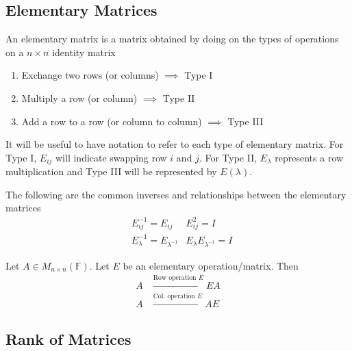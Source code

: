 \documentclass[../notes.tex]{subfiles}
\begin{document}

\subsection{Elementary Matrices}

\begin{definition}
    An elementary matrix is a matrix obtained by doing on the types of operations on a $n \times n$ identity matrix
    \begin{enumerate}
        \item Exchange two rows (or columns) $\implies$ Type I
        \item Multiply a row (or column) $\implies$ Type II
        \item Add a row to a row (or column to column) $\implies$ Type III
    \end{enumerate}
\end{definition}

It will be useful to have notation to refer to each type of elementary matrix. For Type I, $E_{ij}$ will indicate swapping row $i$ and $j$. For Type II, $E_{\lambda}$ represents a row multiplication and Type III will be represented by $E(\lambda)$.

\begin{tcolorbox}[sharp corners = all, colback = white,]
    The following are the common inverses and relationships between the elementary matrices
    \begin{align*}
        & E_{ij}^{-1} = E_{ij} & E_{ij}^2 = I \\
        & E_{\lambda}^{-1} = E_{\lambda^{-1}} & E_{\lambda} E_{\lambda^{-1}} = I
    \end{align*}
\end{tcolorbox}

\begin{theorem}
    Let $A \in M_{n\times n}(\mathbb{F})$. Let $E$ be an elementary operation/matrix. Then
    \begin{align*}
        A &\xrightarrow{\text{Row operation } E} EA \\
        A &\xrightarrow{\text{Col. operation } E} AE
    \end{align*}
\end{theorem}

\subsection{Rank of Matrices}
\end{document}
